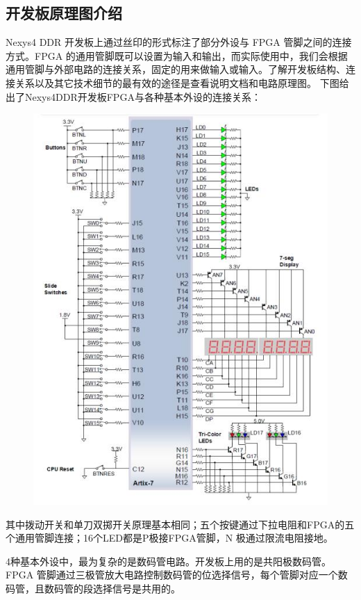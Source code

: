 \documentclass[UTF8]{article}
\begin{document}
	\subsection{开发板原理图介绍}
	Nexys4 DDR 开发板上通过丝印的形式标注了部分外设与 FPGA 管脚之间的连接方式。FPGA 的通用管脚既可以设置为输入和输出，而实际使用中，我们会根据通用管脚与外部电路的连接关系，固定的用来做输入或输入。了解开发板结构、连接关系以及其它技术细节的最有效的途径是查看说明文档和电路原理图。 下图给出了Nexys4DDR开发板FPGA与各种基本外设的连接关系：\par
	\begin{figure}[H]
		\centering
		\includegraphics[width=1\linewidth]{s2_1.jpg}
		\label{s2_1}
	\end{figure}\par
	其中拨动开关和单刀双掷开关原理基本相同；五个按键通过下拉电阻和FPGA的五个通用管脚连接；16个LED都是P极接FPGA管脚，N 极通过限流电阻接地。\par
	4种基本外设中，最为复杂的是数码管电路。开发板上用的是共阳极数码管。FPGA 管脚通过三极管放大电路控制数码管的位选择信号，每个管脚对应一个数码管，且数码管的段选择信号是共用的。\par
\end{document}
